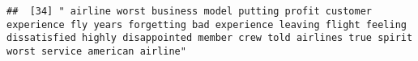 \documentclass[
]{article}
\begin{document}
\begin{verbatim}
##  [34] " airline worst business model putting profit customer experience fly years forgetting bad experience leaving flight feeling dissatisfied highly disappointed member crew told airlines true spirit worst service american airline"                                                                                                                                                                                                                                                                                                                                                                                                                                                                                                                                                                                                                                                                                                                                                                                                                                                                                                                                                                                                                                                                                                                                                                                                                                                                                                                                                                                                                                                                                                                                                             

\end{verbatim}
\end{document}

